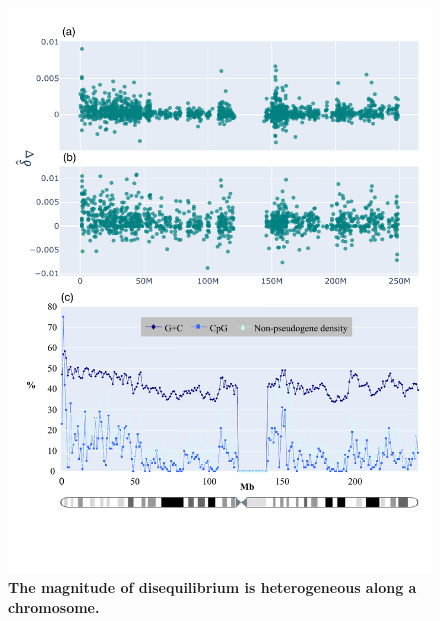 \begin{figure}[htbp]
\centering
\includegraphics[width=	\textwidth]{figures/plots/primate/nabla_CpG_appendix.pdf}
\caption{\textbf{The magnitude of disequilibrium is heterogeneous along a chromosome.}}
\label{fig:primate:dconv-manhattan-appendix}
\end{figure}
